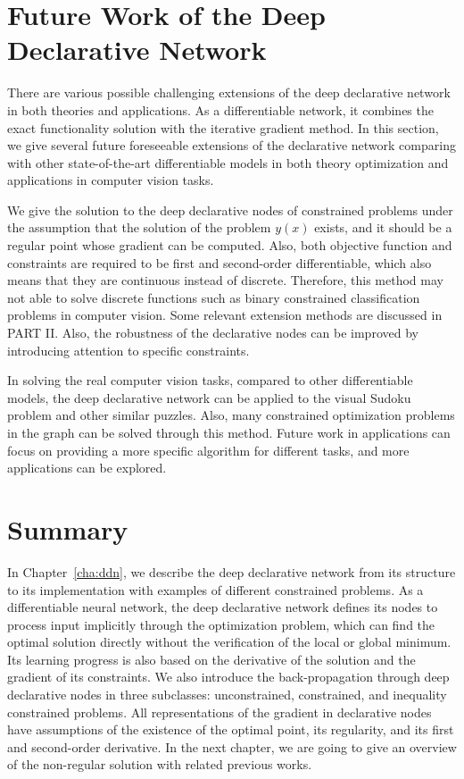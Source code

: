 \section{Future Work of the Deep Declarative Network}
There are various possible challenging extensions of the deep declarative network in both theories and applications. As a differentiable network, it combines the exact functionality solution with the iterative gradient method. In this section, we give several future foreseeable extensions of the declarative network comparing with other state-of-the-art differentiable models in both theory optimization and applications in computer vision tasks. 
\par We give the solution to the deep declarative nodes of constrained problems under the assumption that the solution of the problem $y(x)$ exists, and it should be a regular point whose gradient can be computed. Also, both objective function and constraints are required to be first and second-order differentiable, which also means that they are continuous instead of discrete. Therefore, this method may not able to solve discrete functions such as binary constrained classification problems in computer vision. Some relevant extension methods are discussed in PART II. Also, the robustness of the declarative nodes can be improved by introducing attention to specific constraints. 
\par In solving the real computer vision tasks, compared to other differentiable models, the deep declarative network can be applied to the visual Sudoku problem and other similar puzzles. Also, many constrained optimization problems in the graph can be solved through this method. Future work in applications can focus on providing a more specific algorithm for different tasks, and more applications can be explored. 

\section{Summary}
In Chapter~\ref{cha:ddn}, we describe the deep declarative network from its structure to its implementation with examples of different constrained problems. As a differentiable neural network, the deep declarative network defines its nodes to process input implicitly through the optimization problem, which can find the optimal solution directly without the verification of the local or global minimum. Its learning progress is also based on the derivative of the solution and the gradient of its constraints. We also introduce the back-propagation through deep declarative nodes in three subclasses: unconstrained, constrained, and inequality constrained problems. All representations of the gradient in declarative nodes have assumptions of the existence of the optimal point, its regularity, and its first and second-order derivative. In the next chapter, we are going to give an overview of the non-regular solution with related previous works. 
